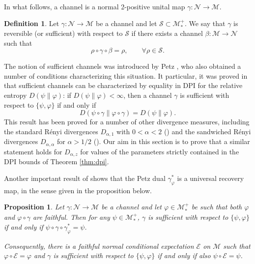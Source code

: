 \documentclass[12pt]{article}
\newtheorem{prop}[theorem]{Proposition}
\theoremstyle{definition}
\newtheorem{defi}[theorem]{Definition}
\theoremstyle{remark}
\numberwithin{equation}{section}
\def\Me{\mathcal M}
\def\Ne{\mathcal N}
\def\ffi{\varphi}
\begin{document}
In what follows, a channel is a normal 2-positive unital map $\gamma: \Ne\to \Me$.

\begin{defi} Let $\gamma:\Ne\to \Me$ be a channel and let $\mathcal S \subset
\Me_*^+$. We say that $\gamma$ is reversible (or sufficient) with respect to $\mathcal S$
if there exists a channel $\beta:\Me\to \Ne$ such that
\[
\rho\circ\gamma\circ\beta=\rho,\qquad \forall \rho\in \mathcal S.
\]

\end{defi}

The notion of sufficient channels was introduced by Petz
\cite{petz1986sufficient,petz1988sufficiency}, who also obtained a number of conditions
characterizing this situation. It particular, it was proved in \cite{petz1988sufficiency}
that sufficient channels can be characterized by equality in DPI for the relative entropy
$D(\psi\|\varphi)$: if $D(\psi\|\varphi)<\infty$, then a channel $\gamma$ is sufficient
with respect to $\{\psi,\varphi\}$ if and only if 
\[
D(\psi\circ\gamma\|\varphi\circ\gamma)=D(\psi\|\varphi). 
\]
This result has been proved for a number of other divergence measures, including the
standard R\'enyi divergences $D_{\alpha,1}$ with $0<\alpha<2$ (\cite{}) and the sandwiched
R\'enyi divergences $D_{\alpha,\alpha}$ for $\alpha>1/2$
(\cite{jencova2018renyi,jencova2021renyi}).
Our aim in this section is to prove that a similar statement holds for $D_{\alpha,z}$ for
values of the parameters strictly contained in the DPI bounds of Theorem \ref{thm:dpi}. 



Another important result of \cite{petz1988sufficiency} shows that the Petz dual $\gamma_\varphi^*$ is a universal
recovery map, in the sense given in the proposition below. 

\begin{prop}\label{prop:universal} Let $\gamma:\Ne\to \Me$ be a channel and let
$\varphi\in \Me_*^+$ be such that both $\ffi$ and $\ffi\circ\gamma$ are faithful. Then for any $\psi\in \Me_*^+$, $\gamma$ is
sufficient with respect to $\{\psi,\varphi\}$ if and only if $\psi\circ\gamma\circ
\gamma_\varphi^*=\psi$.

Consequently, there is a faithful normal conditional expectation $\mathcal E$ on $\Me$
such that $\varphi\circ \mathcal E=\varphi$ and $\gamma$ is sufficient with respect to
$\{\psi,\varphi\}$ if and only if also $\psi\circ\mathcal E=\psi$.

\end{prop}
\end{document}
